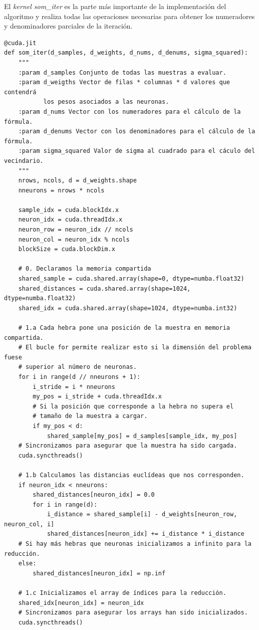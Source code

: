 El \textit{kernel som\_iter} es la parte más importante de la implementación del algoritmo y realiza todas las operaciones necesarias para obtener los numeradores y denominadores parciales de la iteración.
\newpage


\begin{code}
\begin{verbatim}
@cuda.jit
def som_iter(d_samples, d_weights, d_nums, d_denums, sigma_squared):
    """
    :param d_samples Conjunto de todas las muestras a evaluar.
    :param d_weigths Vector de filas * columnas * d valores que contendrá 
           los pesos asociados a las neuronas.
    :param d_nums Vector con los numeradores para el cálculo de la fórmula.
    :param d_denums Vector con los denominadores para el cálculo de la fórmula.
    :param sigma_squared Valor de sigma al cuadrado para el cáculo del vecindario.
    """
    nrows, ncols, d = d_weights.shape
    nneurons = nrows * ncols
    
    sample_idx = cuda.blockIdx.x
    neuron_idx = cuda.threadIdx.x
    neuron_row = neuron_idx // ncols
    neuron_col = neuron_idx % ncols
    blockSize = cuda.blockDim.x
       
    # 0. Declaramos la memoria compartida
    shared_sample = cuda.shared.array(shape=0, dtype=numba.float32)
    shared_distances = cuda.shared.array(shape=1024, dtype=numba.float32)
    shared_idx = cuda.shared.array(shape=1024, dtype=numba.int32)
    
    # 1.a Cada hebra pone una posición de la muestra en memoria compartida.
    # El bucle for permite realizar esto si la dimensión del problema fuese
    # superior al número de neuronas.
    for i in range(d // nneurons + 1):
        i_stride = i * nneurons
        my_pos = i_stride + cuda.threadIdx.x
        # Si la posición que corresponde a la hebra no supera el
        # tamaño de la muestra a cargar.
        if my_pos < d: 
            shared_sample[my_pos] = d_samples[sample_idx, my_pos]
    # Sincronizamos para asegurar que la muestra ha sido cargada.
    cuda.syncthreads()
    
    # 1.b Calculamos las distancias euclídeas que nos corresponden.
    if neuron_idx < nneurons:
        shared_distances[neuron_idx] = 0.0
        for i in range(d):
            i_distance = shared_sample[i] - d_weights[neuron_row, neuron_col, i]
            shared_distances[neuron_idx] += i_distance * i_distance
    # Si hay más hebras que neuronas inicializamos a infinito para la reducción.
    else: 
        shared_distances[neuron_idx] = np.inf
    
    # 1.c Inicializamos el array de índices para la reducción.
    shared_idx[neuron_idx] = neuron_idx
    # Sincronizamos para asegurar los arrays han sido inicializados.
    cuda.syncthreads()    
\end{verbatim}
\label{code:somiter1}
\end{code}

